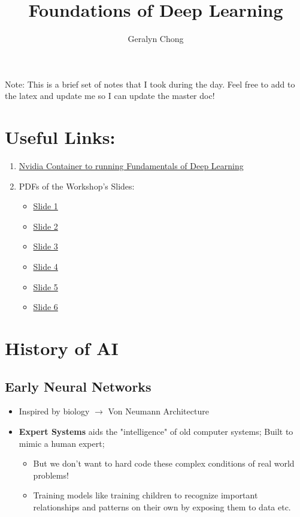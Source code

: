 \documentclass{article}
\title{Foundations of Deep Learning}
\author{Geralyn Chong}
\begin{document}
\maketitle
\tableofcontents

\vspace{10pt}
\begin{small}
Note: This is a brief set of notes that I took during the day. Feel free to add to the latex and update me so I can update the master doc!
\end{small}

\section{Useful Links:}
\begin{enumerate}
    \item \href{https://catalog.ngc.nvidia.com/orgs/nvidia/containers/dli-dl-fundamentals}{Nvidia Container to running Fundamentals of Deep Learning}
    \item PDFs of the Workshop's Slides:
    \begin{itemize}
        \item \href{https://drive.google.com/file/d/1IJbwErD_sPRxy15AlihhnK6s7yEMlci_/view?usp=drive_link}{Slide 1}
        \item \href{https://drive.google.com/file/d/1wIJISrSTmXjoDfUpvk4yGvzBWxXGaXKL/view?usp=sharing}{Slide 2}
        \item \href{https://drive.google.com/file/d/1tT1qHztY3PxpvqJ6jeBhF67t4TYbMtiD/view?usp=drive_link}{Slide 3}
        \item \href{https://drive.google.com/file/d/1v2rKuM5UdxolFZd2iy8b36yGFi_0bmur/view?usp=sharing}{Slide 4}
        \item \href{https://drive.google.com/file/d/1HoWBOPXJSpdl1rIhvSN0EBnoO0VdJYEh/view?usp=drive_link}{Slide 5}
        \item \href{https://drive.google.com/file/d/1aK88wA-z32ZiDT_4isxbjv6FK_aXuM_V/view?usp=drive_link}{Slide 6}
    \end{itemize}
\end{enumerate}
\section{History of AI}
\subsection{Early Neural Networks}
\begin{itemize}
    \item Inspired by biology $\rightarrow$ Von Neumann Architecture
    \item \textbf{Expert Systems} aids the "intelligence" of old computer systems; Built to mimic a human expert; 
    \begin{itemize}
        \item But we don't want to hard code these complex conditions of real world problems! 
        \item Training models like training children to recognize important relationships and patterns on their own by exposing them to data etc. 
    \end{itemize}
\end{itemize}
\end{document}
